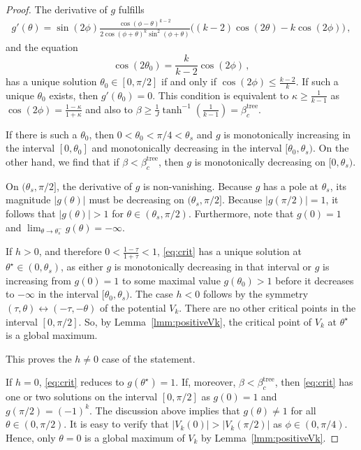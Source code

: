 \documentclass{article}
\numberwithin{theorem}{section}
\theoremstyle{remark}
\begin{document}
\begin{proof}
  The derivative of $g$ fulfills
  \begin{align*}
    g'(\theta) = \sin(2\phi)\frac{\cos(\phi-\theta)^{k-2}}{2\cos(\phi+\theta)^{k}\sin^2(\phi+\theta)} \bigl( (k-2) \cos(2\theta) - k \cos(2\phi) \bigr)\,,
  \end{align*}
  and the equation
  \begin{equation}
    \label{eq:theta_0}
    \cos(2\theta_0) = \frac{k}{k-2}\cos(2\phi)\, ,
  \end{equation}
  has a unique solution $\theta_0 \in [0,\pi/2]$ if and only if 
  $\cos(2\phi) \leq \frac{k-2}{k}$. If such a unique $\theta_0$ exists, then $g'(\theta_0)=0$. This condition is equivalent to $\kappa \geq \frac{1}{k-1}$ as $\cos(2\phi) = \frac{1-\kappa}{1+\kappa}$ 
  and also to $\beta \geq \frac{1}{J} \tanh^{-1}\left( \frac{1}{k-1} \right) = \beta_c^\mathrm{tree}$.

  If there is such a $\theta_0$, then $0<\theta_0 < \pi/4 < \theta_s$
  and $g$ is monotonically increasing in the interval $[0,\theta_0]$ and
  monotonically decreasing in the interval $[\theta_0,\theta_s)$. 
  On the other hand, we find that  if $\beta < \beta_c^\mathrm{tree}$, then
  $g$ is monotonically decreasing on $[0,\theta_s)$.

  On $(\theta_s,\pi/2]$, the derivative of $g$ is non-vanishing. Because $g$ has a pole at $\theta_s$, 
  its magnitude $|g(\theta)|$ must be decreasing on $(\theta_s,\pi/2]$.
  Because $|g(\pi/2)|=1$, it follows that $|g(\theta)| >1$ for $\theta \in (\theta_s,\pi/2)$.
  Furthermore, note that $g(0) =1$ and $\lim_{\theta \rightarrow \theta_s^-} g(\theta) = -\infty$.

  If $h > 0$, and therefore $0<\frac{1-\tau}{1+\tau} < 1$, \eqref{eq:crit} has a unique solution at $\theta^\star \in (0,\theta_s)$,
  as either $g$ is monotonically decreasing in that interval or $g$ is increasing from $g(0)=1$ to some maximal value $g(\theta_0) >1$ before it 
  decreases to $-\infty$ in the interval $[\theta_0,\theta_s)$. The case $h<0$ follows by the symmetry $(\tau,\theta) \leftrightarrow (-\tau,-\theta)$ of the potential $V_k$.
  There are no other critical points in the interval $[0,\pi/2]$. So, by Lemma~\ref{lmm:positiveVk}, the critical point of $V_k$ at $\theta^\star$ is a global maximum.

  This proves the $h \neq 0$ case of the statement.

  If $h=0$, \eqref{eq:crit} reduces to $g(\theta^\star) = 1$. 
  If, moreover, $\beta < \beta_c^\mathrm{tree}$, then \eqref{eq:crit} 
  has one or two solutions on the interval $[0,\pi/2]$ as $g(0) = 1$ and $g(\pi/2) = (-1)^k$.
  The discussion above implies that $g(\theta) \neq 1$ for all $\theta \in (0,\pi/2)$.
  It is easy to verify that $|V_k(0)| > |V_k(\pi/2)|$ as $\phi \in (0,\pi/4)$. Hence, only $\theta = 0$ is a
  global maximum of $V_k$ by Lemma~\ref{lmm:positiveVk}.


\end{proof}
\end{document}
